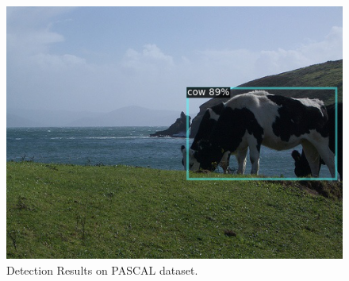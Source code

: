 \documentclass{article}
\begin{document}
\begin{figure}[h!]
\begin{minipage}{0.31\textwidth}
  \includegraphics[width=\textwidth, height=0.17\textheight]{./../../final_results/Pascal/Pascal_10.png}
  \end{minipage}
  \caption{Detection Results on PASCAL dataset. }
  \label{pascal_results}
\end{figure}
\end{document}
